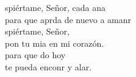 \begin{cancion}[Despiértame][Ixcís]%
	spiértame, Señor, cada ana \\
	para que aprda de nuevo a amanr\\
	spiértame, Señor,\\
	pon tu mia en mi corazón.\\
	para que do hoy \\
	te pueda enconr y alar.\\
\end{cancion}%
